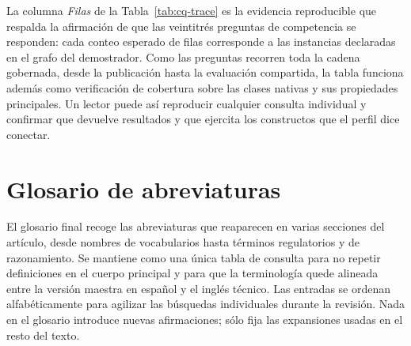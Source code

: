 \documentclass[Afour,sagev,times]{sagej}
\begin{document}
La columna \emph{Filas} de la Tabla~\ref{tab:cq-trace} es la evidencia reproducible que respalda la afirmación de que las veintitrés preguntas de competencia se responden: cada conteo esperado de filas corresponde a las instancias declaradas en el grafo del demostrador. Como las preguntas recorren toda la cadena gobernada, desde la publicación hasta la evaluación compartida, la tabla funciona además como verificación de cobertura sobre las clases nativas y sus propiedades principales. Un lector puede así reproducir cualquier consulta individual y confirmar que devuelve resultados y que ejercita los constructos que el perfil dice conectar.

\section{Glosario de abreviaturas}\label{app:glossary}

El glosario final recoge las abreviaturas que reaparecen en varias secciones del artículo, desde nombres de vocabularios hasta términos regulatorios y de razonamiento. Se mantiene como una única tabla de consulta para no repetir definiciones en el cuerpo principal y para que la terminología quede alineada entre la versión maestra en español y el inglés técnico. Las entradas se ordenan alfabéticamente para agilizar las búsquedas individuales durante la revisión. Nada en el glosario introduce nuevas afirmaciones; sólo fija las expansiones usadas en el resto del texto.
\end{document}
